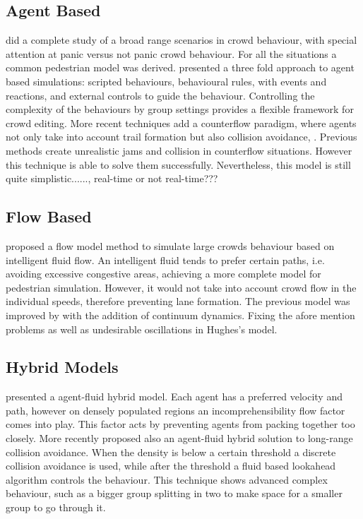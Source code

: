 \documentclass[6pt]{article}
\begin{document}
\begin{multicols}{2}
\subsection{Agent Based}

\cite{helbing2002} did a complete study of a broad range scenarios in crowd behaviour, with special attention at panic versus not panic crowd behaviour.
For all the situations a common pedestrian model was derived.
\cite{raupp2001} presented a three fold approach to agent based simulations: scripted behaviours, behavioural rules, with events and reactions, and external controls to guide the behaviour.
Controlling the complexity of the behaviours by group settings provides a flexible framework for crowd editing.
More recent techniques add a counterflow paradigm, where agents not only take into account trail formation but also collision avoidance, \cite{heliovaara2012}.
Previous methods create unrealistic jams and collision in counterflow situations.
However this technique is able to solve them successfully.
Nevertheless, this model is still quite simplistic......, real-time or not real-time???

\subsection{Flow Based}

\cite{hughes2003} proposed a flow model method to simulate large crowds behaviour based on intelligent fluid flow.
An intelligent fluid tends to prefer certain paths, i.e. avoiding excessive congestive areas, achieving a more complete model for pedestrian simulation.
However, it would not take into account crowd flow in the individual speeds, therefore preventing lane formation. 
The previous model was improved by \cite{treuille2006} with the addition of continuum dynamics.
Fixing the afore mention problems as well as undesirable oscillations in Hughes's model. 

\subsection{Hybrid Models}

\cite{Narain2009} presented a agent-fluid hybrid model.
Each agent has a preferred velocity and path, however on densely populated regions an incomprehensibility flow factor comes into play.
This factor acts by preventing agents from packing together too closely.
More recently \cite{lin2014} proposed also an agent-fluid hybrid solution to long-range collision avoidance.
When the density is below a certain threshold a discrete collision avoidance is used,
while after the threshold a fluid based lookahead algorithm controls the behaviour.
This technique shows advanced complex behaviour, such as a bigger group splitting in two to make space for a smaller group to go through it.


\end{multicols}
\end{document}
